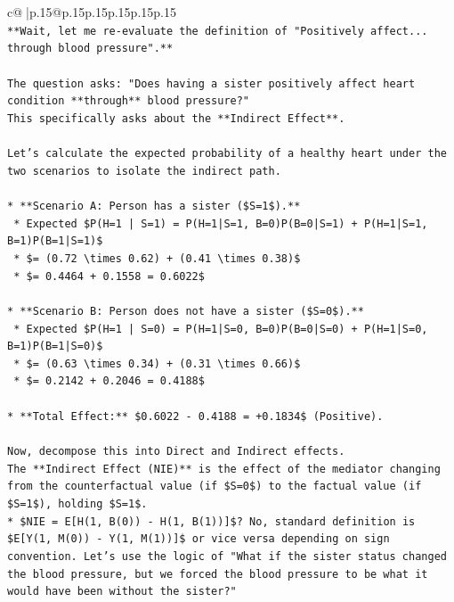 \documentclass{article}
\begin{document}
{\begin{supertabular}{c@{$\;$}|p{.15\linewidth}@{}p{.15\linewidth}p{.15\linewidth}p{.15\linewidth}p{.15\linewidth}p{.15\linewidth}}
{{{\\ 
\texttt{**Wait, let me re{-}evaluate the definition of "Positively affect... through blood pressure".**} \\
\\ 
\texttt{The question asks: "Does having a sister positively affect heart condition **through** blood pressure?"} \\
\texttt{This specifically asks about the **Indirect Effect**.} \\
\\ 
\texttt{Let's calculate the expected probability of a healthy heart under the two scenarios to isolate the indirect path.} \\
\\ 
\texttt{*   **Scenario A: Person has a sister (\$S=1\$).**} \\
\texttt{    *   Expected \$P(H=1 | S=1) = P(H=1|S=1, B=0)P(B=0|S=1) + P(H=1|S=1, B=1)P(B=1|S=1)\$} \\
\texttt{    *   \$= (0.72 \textbackslash{}times 0.62) + (0.41 \textbackslash{}times 0.38)\$} \\
\texttt{    *   \$= 0.4464 + 0.1558 = 0.6022\$} \\
\\ 
\texttt{*   **Scenario B: Person does not have a sister (\$S=0\$).**} \\
\texttt{    *   Expected \$P(H=1 | S=0) = P(H=1|S=0, B=0)P(B=0|S=0) + P(H=1|S=0, B=1)P(B=1|S=0)\$} \\
\texttt{    *   \$= (0.63 \textbackslash{}times 0.34) + (0.31 \textbackslash{}times 0.66)\$} \\
\texttt{    *   \$= 0.2142 + 0.2046 = 0.4188\$} \\
\\ 
\texttt{*   **Total Effect:** \$0.6022 {-} 0.4188 = +0.1834\$ (Positive).} \\
\\ 
\texttt{Now, decompose this into Direct and Indirect effects.} \\
\texttt{The **Indirect Effect (NIE)** is the effect of the mediator changing from the counterfactual value (if \$S=0\$) to the factual value (if \$S=1\$), holding \$S=1\$.} \\
\texttt{*   \$NIE = E{[}H(1, B(0)) {-} H(1, B(1)){]}\$? No, standard definition is \$E{[}Y(1, M(0)) {-} Y(1, M(1)){]}\$ or vice versa depending on sign convention. Let's use the logic of "What if the sister status changed the blood pressure, but we forced the blood pressure to be what it would have been without the sister?"} \\
}}}
\end{supertabular}}
\end{document}

